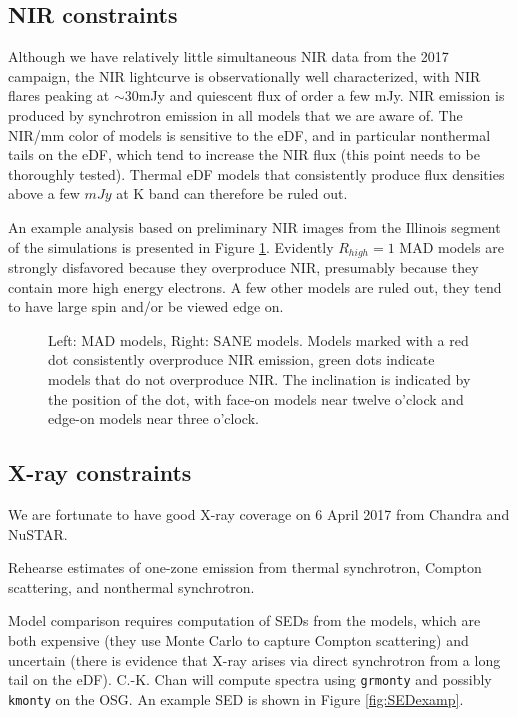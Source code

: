 \documentclass[twocolumn,tighten,dvipsnames]{aastex63}
\newcommand\<{{\langle}}
\renewcommand\>{{\rangle}} %
\begin{document}
\subsection{NIR constraints}

Although we have relatively little simultaneous NIR data from the 2017 campaign, the NIR lightcurve is observationally well characterized, with NIR flares peaking at $\sim 30$mJy and quiescent flux of order a few mJy.  NIR emission is produced by synchrotron emission in all models that we are aware of.  The NIR/mm color of models is sensitive to the eDF, and in particular nonthermal tails on the eDF, which tend to increase the NIR flux (this point needs to be thoroughly tested).  Thermal eDF models that consistently produce flux densities above a few $mJy$ at K band can therefore be ruled out.

An example analysis based on preliminary NIR images from the Illinois segment of the simulations is presented in Figure \ref{fig:NIRmodels}.  Evidently $R_{high} = 1$ MAD models are strongly disfavored because they overproduce NIR, presumably because they contain more high energy electrons.  A few other models are ruled out, they tend to have large spin and/or be viewed edge on.

\begin{figure}
    \centering
    \caption{Left: MAD models, Right: SANE models.  Models marked with a red dot consistently overproduce NIR emission, green dots indicate models that do not overproduce NIR.  The inclination is indicated by the position of the dot, with face-on models near twelve o'clock and edge-on models near three o'clock.}
    \label{fig:NIRmodels}
\end{figure}

\subsection{X-ray constraints}

We are fortunate to have good X-ray coverage on 6 April 2017 from Chandra and NuSTAR.

Rehearse estimates of one-zone emission from thermal synchrotron, Compton scattering, and nonthermal synchrotron.

Model comparison requires computation of SEDs from the models, which are both expensive (they use Monte Carlo to capture Compton scattering) and uncertain (there is evidence that X-ray arises via direct synchrotron from a long tail on the eDF).  C.-K. Chan will compute spectra using {\tt grmonty} and possibly {\tt kmonty} on the OSG.  An example SED is shown in Figure \ref{fig:SEDexamp}.
\end{document}
